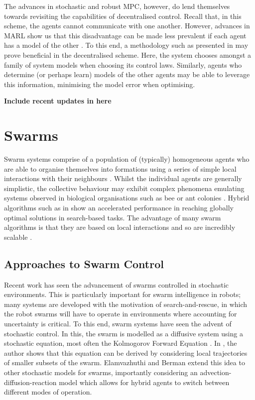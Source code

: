 \documentclass[.../main.tex]{subfiles}
\begin{document}
The advances in stochastic and robust MPC, however, do lend themselves towards revisiting the
capabilities of decentralised control. Recall that, in this scheme, the agents cannot communicate
with one another. However, advances in MARL show us that this disadvantage can be made less
prevalent if each agent has a model of the other \cite{Foerster}. To this end, a methodology such as
presented in \cite{Heirung2019} may prove beneficial in the decentralised scheme. Here, the system
chooses amongst a family of system models when choosing its control laws. Similarly, agents who
determine (or perhaps learn) models of the other agents may be able to leverage this information,
minimising the model error when optimising.

\textbf{Include recent updates in here}

\section{Swarms} \label{sec::Swarms}

Swarm systems comprise of a population of (typically) homogeneous agents who are able to organise
themselves
into formations using a series of simple local interactions with their neighbours
\cite{Couceiro2015}. Whilst the individual agents are generally simplistic, the collective behaviour
may exhibit complex phenomena emulating systems observed in biological organisations such as bee or
ant colonies \cite{Sethi2017}. Hybrid algorithms such as in \cite{Gao2018} show an accelerated
performance in reaching globally optimal solutions in search-based tasks. The advantage of many
swarm algorithms is that they are based on local interactions and so are incredibly scalable
\cite{Rizk2018}.

\subsection{Approaches to Swarm Control} \label{sec::Swarm Control}

Recent work has seen the advancement of swarms controlled in stochastic environments. This is
particularly important for swarm intelligence in robots; many systems are developed with the
motivation of search-and-rescue, in which the robot swarms will have to operate in environments
where accounting for uncertainty is critical. To this end, swarm systems have seen the advent of
stochastic control. In this, the swarm is modelled as a diffusive system using a stochastic
equation, most often the Kolmogorov Forward Equation \cite{Hamann2008}. In \cite{Hamann2008}, the
author shows that this equation can be derived by considering local trajectories of smaller subsets
of the swarm. Elamvazhuthi and Berman \cite{Elamvazhuthi2019} extend this idea to other stochastic
models for swarms, importantly considering an advection-diffusion-reaction model which allows for
hybrid agents to switch between different modes of operation. 
\end{document}
